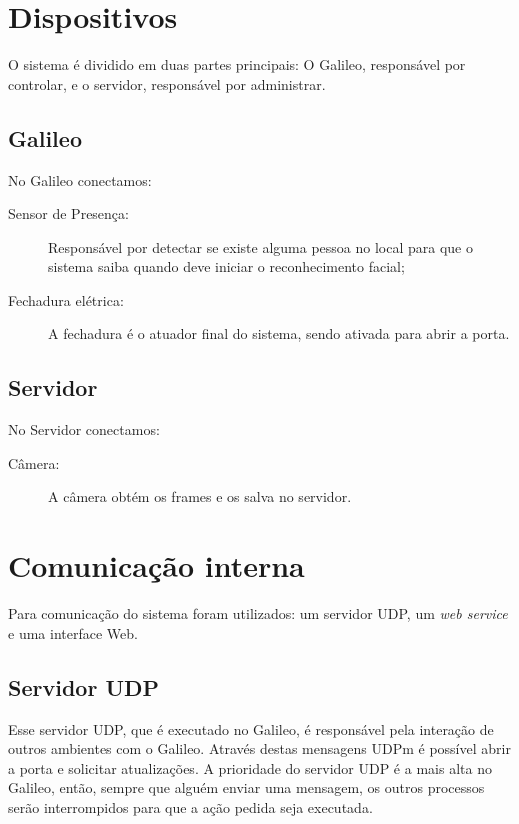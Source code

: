 \documentclass[12pt]{article}
\begin{document}
\section{Dispositivos}
    O sistema é dividido em duas partes principais: O Galileo, responsável por
    controlar, e o servidor, responsável por administrar.


\subsection{Galileo}
    No Galileo conectamos:
    \begin{description}
        \item[Sensor de Presença:] Responsável por detectar se existe alguma
        pessoa no local para que o sistema saiba quando deve iniciar o
        reconhecimento facial;
        \item[Fechadura elétrica:] A fechadura é o atuador final do sistema,
        sendo ativada para abrir a porta.
    \end{description}
\subsection{Servidor}
    No Servidor conectamos:
    \begin{description}
        \item[Câmera:] A câmera obtém os frames e os salva no servidor.
    \end{description}

\section{Comunicação interna}
    Para comunicação do sistema foram utilizados: um servidor UDP, um
    \textit{web service} e uma interface Web.
\subsection{Servidor UDP}
    Esse servidor UDP, que é executado no Galileo, é responsável pela interação
    de outros ambientes com o Galileo. Através destas mensagens UDPm é possível
    abrir a porta e solicitar atualizações.
    A prioridade do servidor UDP é a mais alta no Galileo, então, sempre que
    alguém enviar uma mensagem, os outros processos serão interrompidos para que
    a ação pedida seja executada.
\end{document}
